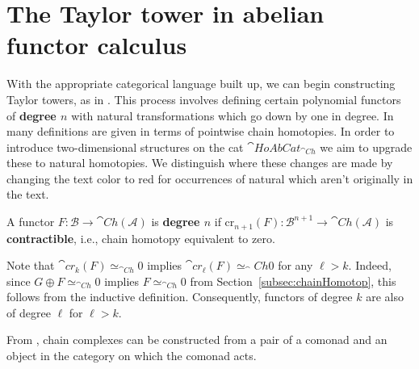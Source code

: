 \section{The Taylor tower in abelian functor calculus}

With the appropriate categorical language built up, we can begin constructing Taylor towers, as in \cite{JohnsonB.2004Dcwc}. This process involves defining certain polynomial functors of \textbf{degree $n$} with natural transformations which go down by one in degree. In \cite{BJORT} many definitions are given in terms of pointwise chain homotopies. In order to introduce two-dimensional structures on the cat $\cat{HoAbCat}_{\cat{Ch}}$ we aim to upgrade these to natural homotopies. We distinguish where these changes are made by changing the text color to red for occurrences of natural which aren't originally in the text.

\begin{defn}[label=defn:4.1]{}
    A functor $F:\mathcal{B}\rightarrow \cat{Ch}(\mathcal{A})$ is \textbf{degree $n$} if $\text{cr}_{n+1}(F):\mathcal{B}^{n+1}\rightarrow \cat{Ch}(\mathcal{A})$ is \textbf{contractible}, i.e.,  chain homotopy equivalent to zero. 
\end{defn}

Note that $\cat{cr}_k(F) \simeq_{\cat{Ch}} 0$ implies $\cat{cr}_\ell(F) \simeq_\cat{Ch} 0$ for any $\ell > k$. Indeed, since $G \oplus F \simeq_{\cat{Ch}} 0$ implies $F \simeq_{\cat{Ch}} 0$ from Section~\ref{subsec:chainHomotop}, this follows from the inductive definition. Consequently, functors of degree $k$ are also of degree $\ell$ for $\ell > k$.

From \cite[Defn 2.4]{JohnsonB.2004Dcwc}, chain complexes can be constructed from a pair of a comonad and an object in the category on which the comonad acts.

